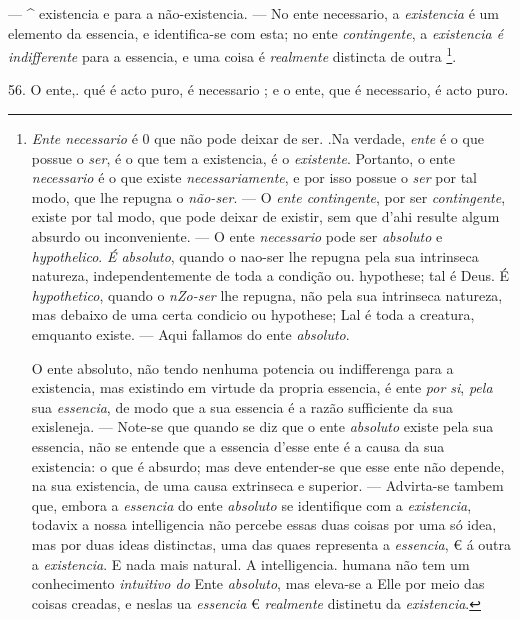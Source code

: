 --- \textasciicircum{}   existencia e para a não-existencia. --- No ente necessario, a \emph{existencia} é um elemento da essencia, e identifica-se com esta; no ente \emph{contingente}, a \emph{existencia é indifferente} para a essencia, e uma coisa é \emph{realmente} distincta de outra \footnote{\emph{Ente necessario} é 0 que não pode deixar de ser. .Na verdade, \emph{ente} é o que possue o \emph{ser}, é o que tem a existencia, é o \emph{existente}. Portanto, o ente \emph{necessario} é o que existe \emph{necessariamente}, e por isso possue o \emph{ser} por tal modo, que lhe repugna o \emph{não-ser}. --- O \emph{ente contingente}, por ser \emph{contingente}, existe por tal modo, que pode deixar de existir, sem que d'ahi resulte algum absurdo ou inconveniente. --- O ente \emph{necessario} pode ser \emph{absoluto} e \emph{hypothelico}. \emph{É absoluto}, quando o nao-ser lhe repugna pela sua intrinseca natureza, independentemente de toda a condição ou. hypothese; tal é Deus. É \emph{hypothetico}, quando o \emph{nZo-ser} lhe repugna, não pela sua intrinseca natureza, mas debaixo de uma certa condicio ou hypothese; Lal é toda a creatura, emquanto existe. --- Aqui fallamos do ente \emph{absoluto}.\par O ente absoluto, não tendo nenhuma potencia ou indifferenga para a existencia, mas existindo em virtude da propria essencia, é ente \emph{por si}, \emph{pela} sua \emph{essencia}, de modo que a sua essencia é a razão sufficiente da sua exisleneja. --- Note-se que quando se diz que o ente \emph{absoluto} existe pela sua essencia, não se entende que a essencia d'esse ente é a causa da sua existencia: o que é absurdo; mas deve entender-se que esse ente não depende, na sua existencia, de uma causa extrinseca e superior. --- Advirta-se tambem que, embora a \emph{essencia} do ente \emph{absoluto} se identifique com a \emph{existencia}, todavix a nossa intelligencia não percebe essas duas coisas por uma só idea, mas por duas ideas distinctas, uma das quaes representa a \emph{essencia}, € á outra a \emph{existencia}. E nada mais natural. A intelligencia. humana não tem um conhecimento \emph{intuitivo do} Ente \emph{absoluto}, mas eleva-se a Elle por meio das coisas creadas, e neslas ua \emph{essencia} € \emph{realmente} distinetu da \emph{existencia}.}.

 56. O ente,. qué é acto puro, é necessario ; e o ente, que é necessario, é acto puro.

